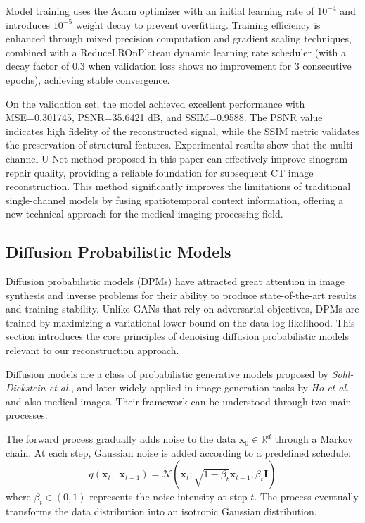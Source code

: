 \documentclass[
reprint,
superscriptaddress,
nofootinbib,
amsmath,amssymb,
aps,
prd,
]{revtex4-2}
\begin{document}
Model training uses the Adam optimizer with an initial learning rate of $10^{-4}$ and introduces $10^{-5}$ weight decay to prevent overfitting. Training efficiency is enhanced through mixed precision computation and gradient scaling techniques, combined with a ReduceLROnPlateau dynamic learning rate scheduler (with a decay factor of 0.3 when validation loss shows no improvement for 3 consecutive epochs), achieving stable convergence.


On the validation set, the model achieved excellent performance with MSE=0.301745, PSNR=35.6421 dB, and SSIM=0.9588. The PSNR value indicates high fidelity of the reconstructed signal, while the SSIM metric validates the preservation of structural features. Experimental results show that the multi-channel U-Net method proposed in this paper can effectively improve sinogram repair quality, providing a reliable foundation for subsequent CT image reconstruction. This method significantly improves the limitations of traditional single-channel models by fusing spatiotemporal context information, offering a new technical approach for the medical imaging processing field.


\subsection{Diffusion Probabilistic Models}
Diffusion probabilistic models (DPMs) have attracted great attention in image synthesis and inverse problems for their ability to produce state-of-the-art results and training stability. Unlike GANs that rely on adversarial objectives, DPMs are trained by maximizing a variational lower bound on the data log-likelihood. This section introduces the core principles of denoising diffusion probabilistic models relevant to our reconstruction approach.

Diffusion models are a class of probabilistic generative models proposed by \textit{Sohl-Dickstein et al.}\cite{pmlr-v37-sohl-dickstein15}, and later widely applied in image generation tasks by \textit{Ho et al.}\cite{ho2020denoisingdiffusionprobabilisticmodels} and also medical images. Their framework can be understood through two main processes:

The forward process gradually adds noise to the data $\mathbf{x}_0 \in \mathbb{R}^d$ through a Markov chain. At each step, Gaussian noise is added according to a predefined schedule:
\begin{equation}
    q(\mathbf{x}_t \mid \mathbf{x}_{t-1}) = \mathcal{N}(\mathbf{x}_t; \sqrt{1 - \beta_t} \mathbf{x}_{t-1}, \beta_t \mathbf{I})
\end{equation}
where $\beta_t \in (0, 1)$ represents the noise intensity at step $t$. The process eventually transforms the data distribution into an isotropic Gaussian distribution.
\end{document}

